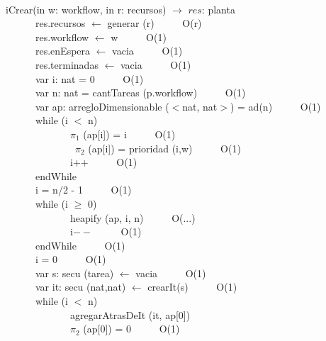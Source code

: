 \documentclass[a4paper,10pt]{article}
\begin{document}
\begin{algoritmo}
\caption{}\\
  iCrear(in w: workflow, in r: recursos) $\rightarrow$ $res$: planta \\
	\indent \ \ \ \ \ \  res.recursos $\gets$ generar (r) \ \ \ \ \ O(r)\\
	\indent \ \ \ \ \ \  res.workflow $\gets$ w \ \ \ \ \ O(1)\\
	\indent \ \ \ \ \ \  res.enEspera $\gets$ vacia \ \ \ \ \ O(1)\\
	\indent \ \ \ \ \ \  res.terminadas $\gets$ vacia \ \ \ \ \ O(1)\\
	\indent \ \ \ \ \ \  var i: nat = 0 \ \ \ \ \ O(1)\\
	\indent \ \ \ \ \ \  var n: nat = cantTareas (p.workflow)  \ \ \ \ \ O(1)\\
	\indent \ \ \ \ \ \  var ap: arregloDimensionable ($<$nat, nat$>$) = ad(n)  \ \ \ \ \ O(1)\\
	\indent \ \ \ \ \ \  while (i $<$ n) \\
	\indent \ \ \ \ \ \ \ \ \ \ \ \ \ $\pi_1$ (ap[i]) = i  \ \ \ \ \ O(1) \\\
	\indent \ \ \ \ \ \ \ \ \ \ \ \ \ $\pi_2$ (ap[i]) = prioridad (i,w) \ \ \ \ \ O(1) \\
	\indent \ \ \ \ \ \ \ \ \ \ \ \ \ i++ \ \ \ \ \ O(1) \\
	\indent \ \ \ \ \ \  endWhile \ \ \ \ \ \\	
	\indent \ \ \ \ \ \  i = n/2 - 1 \ \ \ \ \ O(1)\\
	\indent \ \ \ \ \ \  while (i $\geq$ 0)  \\
	\indent \ \ \ \ \ \ \ \ \ \ \ \ \ heapify (ap, i, n) \ \ \ \ \ O(...) \\
	\indent \ \ \ \ \ \ \ \ \ \ \ \ \ i$--$ \ \ \ \ \ O(1) \\
	\indent \ \ \ \ \ \  endWhile \ \ \ \ \ O(1)\\	
	\indent \ \ \ \ \ \  i = 0 \ \ \ \ \ O(1)\\
	\indent \ \ \ \ \ \  var s: secu (tarea) $\gets$ vacia  \ \ \ \ \ O(1)\\	
	\indent \ \ \ \ \ \  var it: secu (nat,nat) $\gets$ crearIt(s)  \ \ \ \ \ O(1)\\
	\indent \ \ \ \ \ \  while (i $<$ n)  \\
	\indent \ \ \ \ \ \ \ \ \ \ \ \ \ agregarAtrasDeIt (it, ap[0]) \\
	\indent \ \ \ \ \ \ \ \ \ \ \ \ \ $\pi_2$ (ap[0]) = 0  \ \ \ \ \ O(1)\\

\end{algoritmo}
\end{document}
